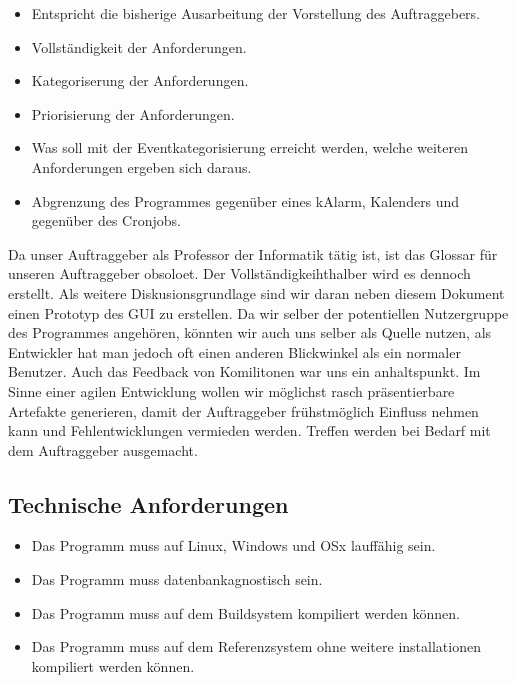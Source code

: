 \documentclass[11pt,titelpage]{scrartcl}
\begin{document}
\begin{itemize}
\item Entspricht die bisherige Ausarbeitung der Vorstellung des Auftraggebers.
\item Vollständigkeit der Anforderungen.
\item Kategoriserung der Anforderungen.
\item Priorisierung der Anforderungen.
\item Was soll mit der Eventkategorisierung erreicht werden, welche weiteren Anforderungen ergeben sich daraus.
\item Abgrenzung des Programmes gegenüber eines kAlarm, Kalenders und gegenüber des Cronjobs.
\end{itemize}
Da unser Auftraggeber als Professor der Informatik tätig ist, ist das Glossar für unseren Auftraggeber obsoloet. Der Vollständigkeihthalber wird es dennoch erstellt.
Als weitere Diskusionsgrundlage sind wir daran neben diesem Dokument einen Prototyp des GUI zu erstellen.
Da wir selber der potentiellen Nutzergruppe des Programmes angehören, könnten wir auch uns selber als Quelle nutzen, als Entwickler hat man jedoch oft einen anderen Blickwinkel als ein normaler Benutzer.
Auch das Feedback von Komilitonen war uns ein anhaltspunkt.
Im Sinne einer agilen Entwicklung wollen wir möglichst rasch präsentierbare Artefakte generieren, damit der Auftraggeber frühstmöglich Einfluss nehmen kann und Fehlentwicklungen vermieden werden. Treffen werden bei Bedarf mit dem Auftraggeber ausgemacht.


\subsection{Technische Anforderungen}

\begin{itemize}
 \item Das Programm muss auf Linux, Windows und OSx lauffähig sein.
 \item Das Programm muss datenbankagnostisch sein.
 \item Das Programm muss auf dem Buildsystem kompiliert werden können.
 \item Das Programm muss auf dem Referenzsystem ohne weitere installationen kompiliert werden können.
\end{itemize}
\end{document}
